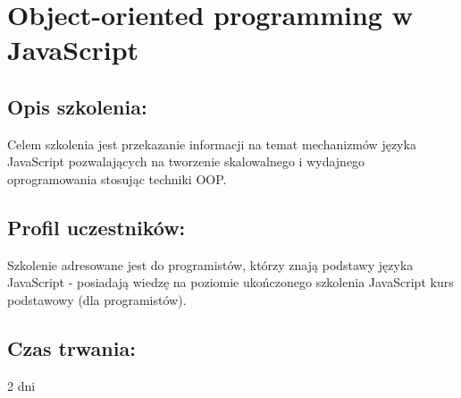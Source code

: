 \documentclass{article}[10pt]
\begin{document}
\newpage


    
	\section{Object-oriented programming
w JavaScript}

	\subsection*{Opis szkolenia:}
	\begin{adjustwidth}{2cm}{}
\justifying
		
Celem szkolenia jest przekazanie informacji na temat mechanizmów języka JavaScript pozwalających na tworzenie skalowalnego i wydajnego oprogramowania stosując techniki OOP.
	\end{adjustwidth}
	\subsection*{Profil uczestników:}
\begin{adjustwidth}{2cm}{}
\justifying
	
Szkolenie adresowane jest do programistów, którzy znają podstawy języka JavaScript  - posiadają wiedzę na poziomie ukończonego szkolenia JavaScript kurs podstawowy (dla programistów).
\end{adjustwidth}
	\subsection*{Czas trwania:}
\begin{adjustwidth}{2cm}{}
	2 dni
\end{adjustwidth}
\end{document}
